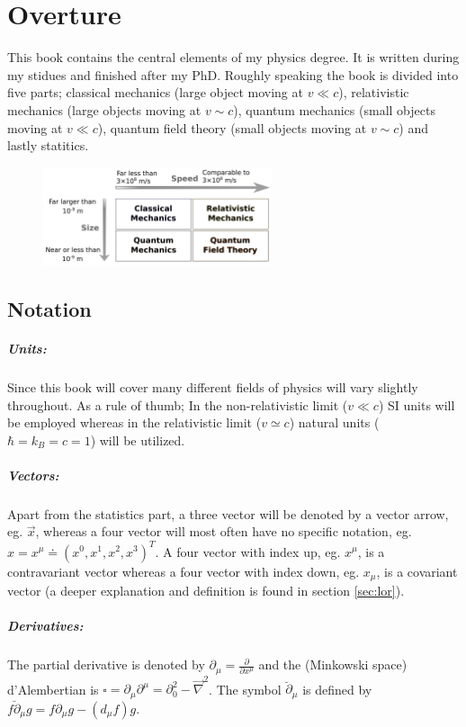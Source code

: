 \chapter{Overture}
This book contains the central elements of my physics degree. It is written during my stidues and finished after my PhD. Roughly speaking the book is divided into five parts; classical mechanics (large object moving at $v\ll c$), relativistic mechanics (large objects moving at $v\sim c$), quantum mechanics (small objects moving at $v\ll c$), quantum field theory (small objects moving at $v\sim c$) and lastly statitics.
\begin{figure}[H]
	\captionsetup{width=1\textwidth}
	\centering
	\includegraphics[width=0.6\textwidth]{figures/ov}
\end{figure}

\section{Notation}
\label{sec:notation}
\paragraph{Units:}
Since this book will cover many different fields of physics will vary slightly throughout. As a rule of thumb; In the non-relativistic limit ($v\ll c$) SI units will be employed whereas in the relativistic limit ($v\simeq c$) natural units ($\hbar=k_B=c=1$) will be utilized. 

\paragraph{Vectors:}
Apart from the statistics part, a three vector will be denoted by a vector arrow, eg. $\vec{x}$, whereas a four vector will most often have no specific notation, eg. $x=x^\mu\doteq (x^0,x^1,x^2,x^3)^T$. A four vector with index up, eg. $x^\mu$, is a contravariant vector whereas a four vector with index down, eg. $x_\mu$, is a covariant vector (a deeper explanation and definition is found in section \ref{sec:lor}).

\paragraph{Derivatives:}
The partial derivative is denoted by $\partial_\mu= \frac{\partial}{\partial x^\mu}$ and the (Minkowski space) d'Alembertian is $\square=\partial_\mu\partial^\mu=\partial_0^2-\vec{\nabla}^2$. The symbol $\breve{\partial}_\mu$ is defined by $f\breve{\partial}_\mu g=f\partial_\mu g-(d_\mu f)g$.

